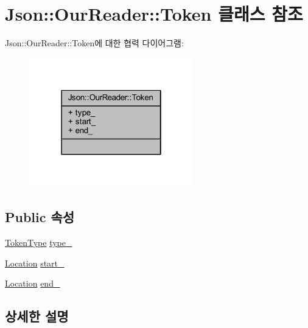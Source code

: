 \hypertarget{class_json_1_1_our_reader_1_1_token}{}\section{Json\+:\+:Our\+Reader\+:\+:Token 클래스 참조}
\label{class_json_1_1_our_reader_1_1_token}


Json\+:\+:Our\+Reader\+:\+:Token에 대한 협력 다이어그램\+:\nopagebreak
\begin{figure}[H]
\begin{center}
\leavevmode
\includegraphics[width=202pt]{class_json_1_1_our_reader_1_1_token__coll__graph}
\end{center}
\end{figure}
\subsection*{Public 속성}
\begin{DoxyCompactItemize}
\item 
\hyperlink{class_json_1_1_our_reader_a15116f7276ddf1e7a2cc3cbefa884dcc}{Token\+Type} \hyperlink{class_json_1_1_our_reader_1_1_token_abe7d858530396fa7e1293f7a579880ed}{type\+\_\+}
\item 
\hyperlink{class_json_1_1_our_reader_a1bdc7bbc52ba87cae6b19746f2ee0189}{Location} \hyperlink{class_json_1_1_our_reader_1_1_token_aedf68bb00eaaa9d3c22b9825999602ac}{start\+\_\+}
\item 
\hyperlink{class_json_1_1_our_reader_a1bdc7bbc52ba87cae6b19746f2ee0189}{Location} \hyperlink{class_json_1_1_our_reader_1_1_token_a67d2071638add857528579ae3791eccc}{end\+\_\+}
\end{DoxyCompactItemize}


\subsection{상세한 설명}


